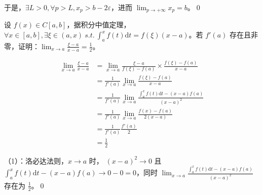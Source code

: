 于是，$\displaystyle \exists L >0,\forall p >L,x_{p}  >b-2\varepsilon $，进而 $\displaystyle \lim _{p\rightarrow +\infty } x_{p} =b$。\qed 



\begin{ques}
	设 $\displaystyle f( x) \in C[ a,b]$，据积分中值定理，$\displaystyle \forall x\in [ a,b] ,\exists \xi \in ( a,x) \ s.t.\ \int _{a}^{x} f( t)\mathrm{d} t=f( \xi )( x-a)$。若 $\displaystyle f'( a)$ 存在且非零，证明：$\displaystyle \lim _{x\rightarrow a}\frac{\xi -a}{x-a} =\frac{1}{2}$。
\end{ques}
\begin{align*}
	\lim _{x\rightarrow a}\frac{\xi -a}{x-a} & =\lim _{x\rightarrow a}\frac{\xi -a}{f( \xi ) -f( a)} \times \frac{f( \xi ) -f( a)}{x-a}\\
	& =\frac{1}{f'( a)}\lim _{x\rightarrow a}\frac{f( \xi ) -f( a)}{x-a}\\
	& =\frac{1}{f'( a)}\lim _{x\rightarrow a}\frac{\int _{a}^{x} f( t)\mathrm{d} t-( x-a) f( a)}{( x-a)^{2}}\\
	& =\frac{1}{f'( a)}\lim _{x\rightarrow a}\frac{f( x) -f( a)}{2( x-a)}\\
	& =\frac{1}{f'( a)}\frac{f'( a)}{2}\\
	& =\frac{1}{2}
\end{align*}

（1）：洛必达法则，$\displaystyle x\rightarrow a$ 时， $\displaystyle ( x-a)^{2}\rightarrow 0$ 且 $\displaystyle \int _{a}^{x} f( t)\mathrm{d} t-( x-a) f( a)\rightarrow 0-0=0$，同时 $\displaystyle \lim _{x\rightarrow a}\frac{\int _{a}^{x} f( t)\mathrm{d} t-( x-a) f( a)}{( x-a)^{2}}$ 存在为 $\displaystyle \frac{1}{2}$。\qed 

\ifx\allfiles\undefined

\fi